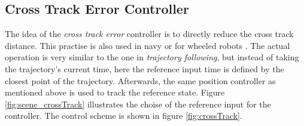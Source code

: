 %

\subsection{Cross Track Error Controller}
The idea of the \textit{cross track error} controller is to directly reduce the cross track distance. This practise is also used in navy \cite{williams} or for wheeled robots \cite{deluca}. The actual operation is very similar to the one in \textit{trajectory following}, but instead of taking the trajectory's current time, here the reference input time is defined by the closest point of the trajectory. Afterwards, the same position controller as mentioned above is used to track the reference state. Figure \ref{fig:scene_crossTrack} illustrates the choise of the reference input for the controller. The control scheme is shown in figure \ref{fig:crossTrack}.

